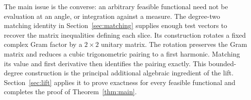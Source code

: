 The main issue is the converse: an arbitrary feasible functional need
not be evaluation at an angle, or integration against a measure.
The degree-two matching identity in Section~\ref{sec:matching} supplies
enough test vectors to recover the matrix inequalities defining each
slice. Its construction rotates a fixed complex Gram factor by a
$2\times2$ unitary matrix. The rotation preserves the Gram matrix and
reduces a cubic trigonometric pairing to a first harmonic. Matching
its value and first derivative then identifies the pairing exactly.
This bounded-degree construction is the principal additional algebraic
ingredient of the lift. Section~\ref{sec:lift} applies it to prove
exactness for every feasible functional and completes the proof of
Theorem~\ref{thm:main}.
